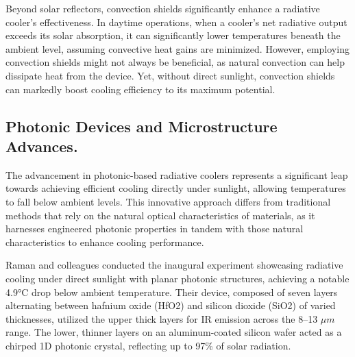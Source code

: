 Beyond solar reflectors, convection shields significantly enhance a radiative cooler's effectiveness. In daytime operations, when a cooler's net radiative output exceeds its solar absorption, it can significantly lower temperatures beneath the ambient level, assuming convective heat gains are minimized. However, employing convection shields might not always be beneficial, as natural convection can help dissipate heat from the device. Yet, without direct sunlight, convection shields can markedly boost cooling efficiency to its maximum potential.

\subsection{Photonic Devices and Microstructure Advances.}
The advancement in photonic-based radiative coolers represents a significant leap towards achieving efficient cooling directly under sunlight, allowing temperatures to fall below ambient levels. This innovative approach differs from traditional methods that rely on the natural optical characteristics of materials, as it harnesses engineered photonic properties in tandem with those natural characteristics to enhance cooling performance.

Raman and colleagues conducted the inaugural experiment showcasing radiative cooling under direct sunlight with planar photonic structures, achieving a notable 4.9°C drop below ambient temperature. Their device, composed of seven layers alternating between hafnium oxide (HfO2) and silicon dioxide (SiO2) of varied thicknesses, utilized the upper thick layers for IR emission across the 8–13 $\mu m$ range. The lower, thinner layers on an aluminum-coated silicon wafer acted as a chirped 1D photonic crystal, reflecting up to 97\% of solar radiation.


